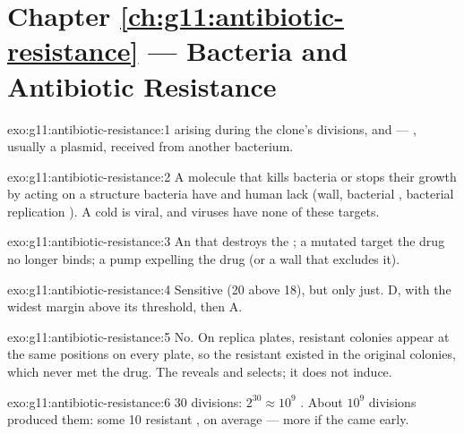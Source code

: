 \section*{Chapter \ref{ch:g11:antibiotic-resistance} --- Bacteria and Antibiotic Resistance}

\begin{solution}{exo:g11:antibiotic-resistance:1}
 arising during the clone's divisions, and  --- , usually a plasmid, received from another bacterium.
\end{solution}

\begin{solution}{exo:g11:antibiotic-resistance:2}
A molecule that kills bacteria or stops their growth by acting on a
structure bacteria have and human  lack (wall, bacterial
, bacterial replication ). A cold is viral, and
viruses have none of these targets.
\end{solution}

\begin{solution}{exo:g11:antibiotic-resistance:3}
An  that destroys the ; a mutated target the drug no
longer binds; a pump expelling the drug (or a wall that excludes it).
\end{solution}

\begin{solution}{exo:g11:antibiotic-resistance:4}
Sensitive (20 above 18), but only just. D, with the widest margin
above its threshold, then A.
\end{solution}

\begin{solution}{exo:g11:antibiotic-resistance:5}
No. On replica plates, resistant colonies appear at the same positions
on every  plate, so the resistant  existed in the
original colonies, which never met the drug. The  reveals
and selects; it does not induce.
\end{solution}

\begin{solution}{exo:g11:antibiotic-resistance:6}
30 divisions: $2^{30} \approx 10^9$ . About $10^9$ divisions
produced them: some 10 resistant , on average --- more if the
 came early.
\end{solution}


